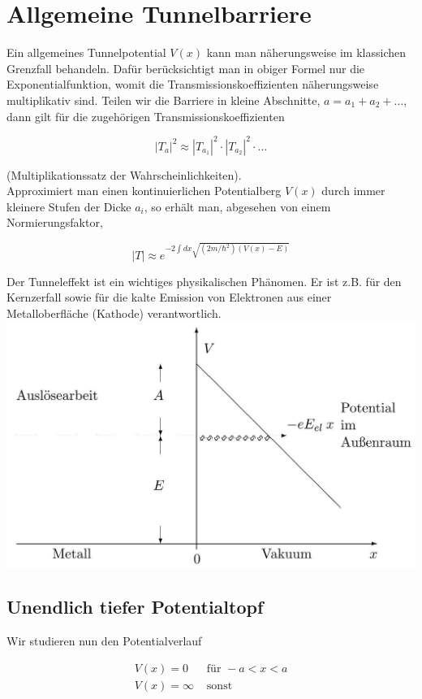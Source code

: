 \documentclass[10pt, letterpaper]{article}
\begin{document}
\section*{Allgemeine Tunnelbarriere}
Ein allgemeines Tunnelpotential $V(x)$ kann man näherungsweise im klassichen Grenzfall behandeln. Dafür berücksichtigt man in obiger Formel nur die Exponentialfunktion, womit die Transmissionskoeffizienten näherungsweise multiplikativ sind. Teilen wir die Barriere in kleine Abschnitte, $a=a_{1}+a_{2}+\ldots$, dann gilt für die zugehörigen Transmissionskoeffizienten

$$
\left|T_{a}\right|^{2} \approx\left|T_{a_{1}}\right|^{2} \cdot\left|T_{a_{2}}\right|^{2} \cdot \ldots
$$

(Multiplikationssatz der Wahrscheinlichkeiten).\\
Approximiert man einen kontinuierlichen Potentialberg $V(x)$ durch immer kleinere Stufen der Dicke $a_{i}$, so erhält man, abgesehen von einem Normierungsfaktor,

$$
|T| \approx e^{-2 \int d x \sqrt{\left(2 m / \hbar^{2}\right)(V(x)-E)}}
$$

Der Tunneleffekt ist ein wichtiges physikalischen Phänomen. Er ist z.B. für den Kernzerfall sowie für die kalte Emission von Elektronen aus einer Metalloberfläche (Kathode) verantwortlich.\\
\includegraphics[scale=0.2, center]{2025_05_21_2790b5a0182e53887e3bg-11}

\subsection*{Unendlich tiefer Potentialtopf}
Wir studieren nun den Potentialverlauf

$$
\begin{array}{ll}
V(x)=0 & \text { für }-a<x<a \\
V(x)=\infty & \text { sonst }
\end{array}
$$
\end{document}
